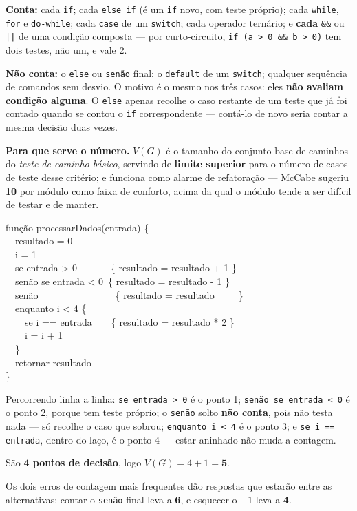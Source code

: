 \begin{conceito}
\textbf{Conta:} cada \texttt{if}; cada \texttt{else if} (é um \texttt{if}
novo, com teste próprio); cada \texttt{while}, \texttt{for} e
\texttt{do-while}; cada \texttt{case} de um \texttt{switch}; cada operador
ternário; e \textbf{cada} \texttt{\&\&} ou \texttt{||} de uma condição
composta --- por curto-circuito, \texttt{if (a > 0 \&\& b > 0)} tem dois
testes, não um, e vale 2.

\textbf{Não conta:} o \texttt{else} ou \texttt{senão} final; o
\texttt{default} de um \texttt{switch}; qualquer sequência de comandos sem
desvio. O motivo é o mesmo nos três casos: eles \textbf{não avaliam
condição alguma}. O \texttt{else} apenas recolhe o caso restante de um teste
que já foi contado quando se contou o \texttt{if} correspondente --- contá-lo
de novo seria contar a mesma decisão duas vezes.

\textbf{Para que serve o número.} $V(G)$ é o tamanho do conjunto-base de
caminhos do \textit{teste de caminho básico}, servindo de \textbf{limite
superior} para o número de casos de teste desse critério; e funciona como
alarme de refatoração --- McCabe sugeriu \textbf{10} por módulo como faixa de
conforto, acima da qual o módulo tende a ser difícil de testar e de manter.
\end{conceito}

\begin{exemplo}
\begin{flushleft}\ttfamily\small
função processarDados(entrada) \{ \\
~~resultado = 0 \\
~~i = 1 \\
~~se entrada > 0~~~~~~~\{ resultado = resultado + 1 \} \\
~~senão se entrada < 0~\{ resultado = resultado - 1 \} \\
~~senão~~~~~~~~~~~~~~~~\{ resultado = resultado~~~~~\} \\
~~enquanto i < 4 \{ \\
~~~~se i == entrada~~~~\{ resultado = resultado * 2 \} \\
~~~~i = i + 1 \\
~~\} \\
~~retornar resultado \\
\}
\end{flushleft}

Percorrendo linha a linha: \texttt{se entrada > 0} é o ponto 1;
\texttt{senão se entrada < 0} é o ponto 2, porque tem teste próprio; o
\texttt{senão} solto \textbf{não conta}, pois não testa nada --- só recolhe
o caso que sobrou; \texttt{enquanto i < 4} é o ponto 3; e \texttt{se i ==
entrada}, dentro do laço, é o ponto 4 --- estar aninhado não muda a
contagem.

São \textbf{4 pontos de decisão}, logo $V(G) = 4 + 1 = \mathbf{5}$.

Os dois erros de contagem mais frequentes dão respostas que estarão entre as
alternativas: contar o \texttt{senão} final leva a \textbf{6}, e esquecer o
$+1$ leva a \textbf{4}.
\end{exemplo}

